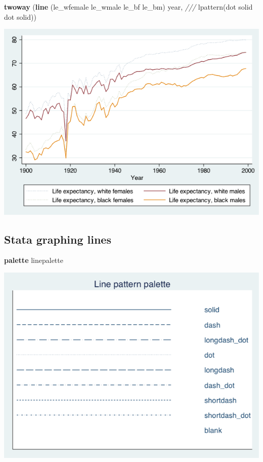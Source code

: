 \documentclass[
]{book}
\newenvironment{Shaded}{\begin{snugshade}}{\end{snugshade}}
\newcommand{\BaseNTok}[1]{\textcolor[rgb]{0.00,0.00,0.81}{#1}}
\newcommand{\CommentTok}[1]{\textcolor[rgb]{0.56,0.35,0.01}{\textit{#1}}}
\newcommand{\FunctionTok}[1]{\textcolor[rgb]{0.00,0.00,0.00}{#1}}
\newcommand{\KeywordTok}[1]{\textcolor[rgb]{0.13,0.29,0.53}{\textbf{#1}}}
\newcommand{\NormalTok}[1]{#1}
\begin{document}
\begin{Shaded}
\begin{Highlighting}[]
\KeywordTok{twoway}\NormalTok{ (}\KeywordTok{line}\NormalTok{ (le\_wfemale le\_wmale le\_bf le\_bm) }\FunctionTok{year}\NormalTok{, }\CommentTok{///}
\NormalTok{       lpattern(}\BaseNTok{dot}\NormalTok{ solid }\BaseNTok{dot}\NormalTok{ solid))}
\end{Highlighting}
\end{Shaded}

\includegraphics{Stata/StataGraph/images/linegraph2.png}

\hypertarget{stata-graphing-lines}{%
\subsection{Stata graphing lines}\label{stata-graphing-lines}}

\begin{Shaded}
\begin{Highlighting}[]
\KeywordTok{palette}\NormalTok{ linepalette}
\end{Highlighting}
\end{Shaded}

\includegraphics{Stata/StataGraph/images/linepalette.png}
\end{document}

